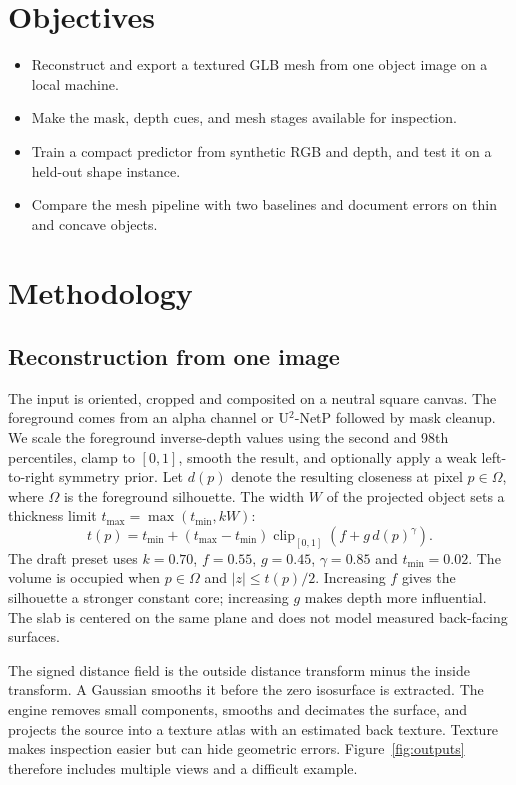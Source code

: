\documentclass[conference]{IEEEtran}
\begin{document}
\section{Objectives}
\begin{itemize}
\item Reconstruct and export a textured GLB mesh from one object image on a local machine.
\item Make the mask, depth cues, and mesh stages available for inspection.
\item Train a compact predictor from synthetic RGB and depth, and test it on a held-out shape instance.
\item Compare the mesh pipeline with two baselines and document errors on thin and concave objects.
\end{itemize}

\section{Methodology}
\subsection{Reconstruction from one image}
The input is oriented, cropped and composited on a neutral square canvas. The foreground comes from an alpha channel or U$^2$-NetP followed by mask cleanup. We scale the foreground inverse-depth values using the second and 98th percentiles, clamp to $[0,1]$, smooth the result, and optionally apply a weak left-to-right symmetry prior. Let $d(p)$ denote the resulting closeness at pixel $p\in\Omega$, where $\Omega$ is the foreground silhouette. The width $W$ of the projected object sets a thickness limit $t_{\max}=\max(t_{\min},kW)$:
\begin{equation}
t(p)=t_{\min}+(t_{\max}-t_{\min})
\operatorname{clip}_{[0,1]}\!\left(f+g\,d(p)^\gamma\right).
\end{equation}
The draft preset uses $k=0.70$, $f=0.55$, $g=0.45$, $\gamma=0.85$ and $t_{\min}=0.02$. The volume is occupied when $p\in\Omega$ and $|z|\leq t(p)/2$. Increasing $f$ gives the silhouette a stronger constant core; increasing $g$ makes depth more influential. The slab is centered on the same plane and does not model measured back-facing surfaces.

The signed distance field is the outside distance transform minus the inside transform. A Gaussian smooths it before the zero isosurface is extracted. The engine removes small components, smooths and decimates the surface, and projects the source into a texture atlas with an estimated back texture. Texture makes inspection easier but can hide geometric errors. Figure~\ref{fig:outputs} therefore includes multiple views and a difficult example.
\end{document}
